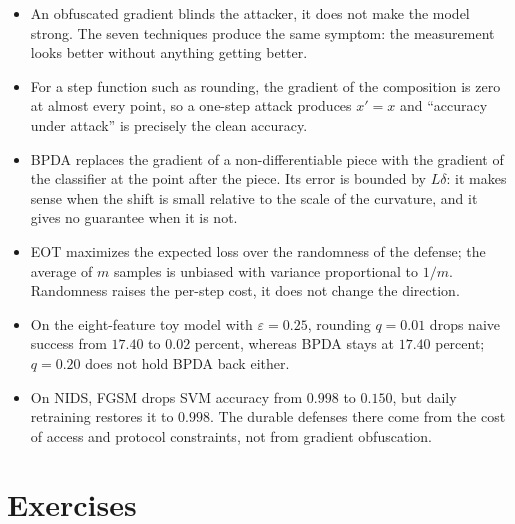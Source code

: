 
\begin{ringkasan}
\begin{itemize}
  \item An obfuscated gradient blinds the attacker, it does not make the model strong.
        The seven techniques produce the same symptom: the measurement looks better
        without anything getting better.
  \item For a step function such as rounding, the gradient of the composition is zero at almost every
        point, so a one-step attack produces $x'=x$ and ``accuracy under
        attack'' is precisely the clean accuracy.
  \item BPDA replaces the gradient of a non-differentiable piece with the gradient of the
        classifier at the point after the piece. Its error is bounded by $L\delta$: it makes
        sense when the shift is small relative to the scale of the curvature, and it gives no guarantee
        when it is not.
  \item EOT maximizes the expected loss over the randomness of the defense; the average of $m$
        samples is unbiased with variance proportional to $1/m$. Randomness raises the per-step
        cost, it does not change the direction.
  \item On the eight-feature toy model with $\varepsilon=0.25$, rounding
        $q=0.01$ drops naive success from $17.40$ to $0.02$ percent,
        whereas BPDA stays at $17.40$ percent; $q=0.20$ does not hold BPDA back either.
  \item On NIDS, FGSM drops SVM accuracy from $0.998$ to $0.150$, but
        daily retraining restores it to $0.998$. The durable defenses there
        come from the cost of access and protocol constraints, not from gradient obfuscation.
\end{itemize}
\end{ringkasan}

\section{Exercises}

